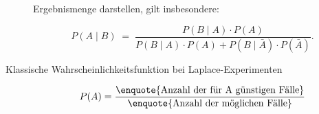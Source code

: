 \documentclass[8pt,landscape]{scrartcl}
\begin{document}
\begin{multicols}{3}
\begin{description}
Ergebnismenge darstellen, gilt insbesondere:

\begin{equation*} 
    P(A \mid B) \; = \; \frac{P(B \mid A) \cdot P(A)}{P(B \mid A) \cdot P(A) + P(B \mid \bar{A}) \cdot P(\bar{A})}.
\end{equation*}
\item[Klassische Wahrscheinlichkeitsfunktion bei Laplace-Experimenten]
\begin{equation*}
    P(A) = \frac{\text{\enquote{Anzahl der für A günstigen Fälle}}}{\text{\enquote{Anzahl der möglichen Fälle}}}
\end{equation*}
\end{description}

%
%
%
\end{multicols}
\end{document}
